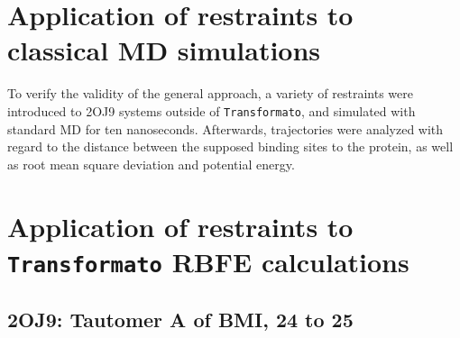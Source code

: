 \documentclass[oneside]{scrreprt}
\begin{document}
\section{Application of restraints to classical MD simulations}

To verify the validity of the general approach, a variety of restraints were introduced to 2OJ9 systems outside of \texttt{Transformato}, and simulated with standard MD for ten nanoseconds. Afterwards, trajectories were analyzed with regard to the distance between the supposed binding sites to the protein, as well as root mean square deviation and potential energy.
\section{Application of restraints to \texttt{Transformato} RBFE calculations}
\newpage
\subsection{2OJ9: Tautomer A of BMI, 24 to 25}
\end{document}
